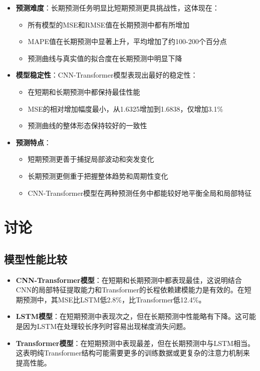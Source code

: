 \documentclass[a4paper,11pt]{article}
\begin{document}
\begin{itemize}
    \item \textbf{预测难度}：长期预测任务明显比短期预测更具挑战性，这体现在：
    \begin{itemize}
        \item 所有模型的MSE和RMSE值在长期预测中都有所增加
        \item MAPE值在长期预测中显著上升，平均增加了约100-200个百分点
        \item 预测曲线与真实值的拟合度在长期预测中明显下降
    \end{itemize}
    
    \item \textbf{模型稳定性}：CNN-Transformer模型表现出最好的稳定性：
    \begin{itemize}
        \item 在短期和长期预测中都保持最佳性能
        \item MSE的相对增加幅度最小，从1.6325增加到1.6838，仅增加3.1\%
        \item 预测曲线的整体形态保持较好的一致性
    \end{itemize}
    
    \item \textbf{预测特点}：
    \begin{itemize}
        \item 短期预测更善于捕捉局部波动和突发变化
        \item 长期预测更侧重于把握整体趋势和周期性变化
        \item CNN-Transformer模型在两种预测任务中都能较好地平衡全局和局部特征
    \end{itemize}
\end{itemize}

\section{讨论}

\subsection{模型性能比较}
\begin{itemize}
    \item \textbf{CNN-Transformer模型}：在短期和长期预测中都表现最佳，这说明结合CNN的局部特征提取能力和Transformer的长程依赖建模能力是有效的。在短期预测中，其MSE比LSTM低2.8\%，比Transformer低12.4\%。

    \item \textbf{LSTM模型}：在短期预测中表现次之，但在长期预测中性能略有下降。这可能是因为LSTM在处理较长序列时容易出现梯度消失问题。

    \item \textbf{Transformer模型}：在短期预测中表现最差，但在长期预测中与LSTM相当。这表明纯Transformer结构可能需要更多的训练数据或更复杂的注意力机制来提高性能。
\end{itemize}
\end{document}
